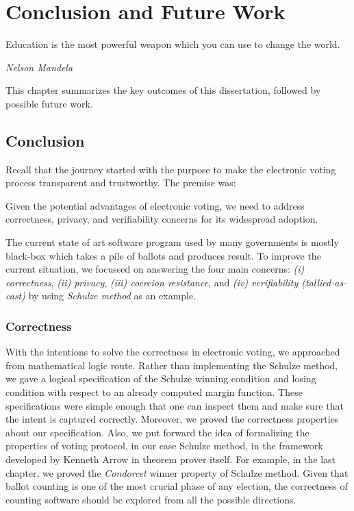 \chapter{Conclusion and Future Work}
\label{cha:conc}

\epigraph{Education is the most powerful weapon which you can use to change the world.} 
{\textit{Nelson Mandela}}

This chapter summarizes the key outcomes of this dissertation, followed by possible 
future work. 

\section{Conclusion}
Recall that the journey started with the purpose to make the electronic voting 
process transparent and trustworthy.  The premise was:

\begin{displayquote}
Given the potential advantages of electronic voting, we need to address correctness,
privacy, and verifiability concerns for its widespread adoption.
\end{displayquote}

The current state of 
art software program used by many governments is mostly black-box which 
takes a pile of ballots and produces result.  To improve the current situation, 
we focussed on answering the 
four main concerns: \textit{(i) correctness}, \textit{(ii) privacy},
\textit{(iii) coercion resistance}, and \textit{(iv) verifiability (tallied-as-cast)} by 
using \textit{Schulze method} as an example. 

\subsection{Correctness}
With the intentions to solve the 
correctness in electronic voting, we approached from 
mathematical logic route.  Rather than implementing the Schulze method, 
we gave a logical specification of the Schulze winning condition and losing 
condition with respect to an already computed margin function. 
These specifications were simple enough that 
one can inspect them and 
make sure that the intent is captured correctly. 
Moreover, we proved the correctness properties about our specification.
Also, we put forward the idea of formalizing the properties 
of voting protocol, in our case Schulze method, in the framework developed by Kenneth Arrow 
in theorem prover itself. For example, 
in the last chapter, we proved the \textit{Condorcet} winner property 
of Schulze method. Given that ballot counting is one of the most 
crucial phase of any election, the correctness of counting software 
should be explored from all the possible directions. 

